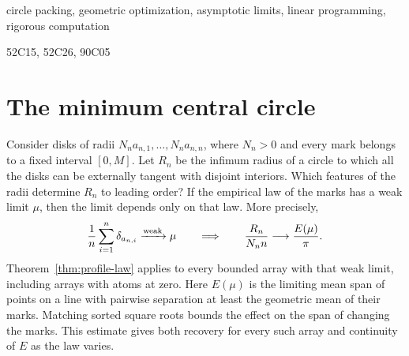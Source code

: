 \documentclass[review,hidelinks,onefignum,onetabnum]{siamart251216}
\begin{document}
\maketitle
\begin{abstract}
Let $R_n$ be the infimum radius of a central circle externally tangent
to $n$ disks with pairwise disjoint interiors. Write the outer radii as
$N_n a_{n,i}$, with positive scales $N_n$ and uniformly bounded
nonnegative marks. If the empirical laws of the marks converge weakly
to $\mu$, then $R_n/(N_n n)\to E(\mu)/\pi$. Here $E(\mu)$ is the limiting
mean span of points on a line whose pairwise separations are at least the
geometric means of their marks. A linear program on $k$ quantile types
and words of length $r$ encloses the limiting ring coefficient within an
interval of width $M(k+r)/(\pi kr)$ before numerical evaluation of the
word costs, where $M$ is the common mark bound.
For consecutive integer radii the minimum grows quadratically, with leading
coefficient $0.1405694688<C_\ast<0.140958576058$. Coupled terminal subsets give
the lower bound and a rational line placement gives the upper bound. The
profile theorem also applies to every fixed positive power of the labels.
For square radii the growth is cubic, with leading coefficient
$(434+4\sqrt2)/(1587\pi)\le C_2<0.088581212993$.
\end{abstract}
\begin{keywords}
circle packing, geometric optimization, asymptotic limits, linear programming,
rigorous computation
\end{keywords}
\begin{MSCcodes}
52C15, 52C26, 90C05
\end{MSCcodes}

\section{The minimum central circle}

Consider disks of radii $N_n a_{n,1},\ldots,N_n a_{n,n}$, where $N_n>0$
and every mark belongs to a fixed interval $[0,M]$. Let $R_n$ be the
infimum radius of a circle to which all the disks can be externally
tangent with disjoint interiors. Which features of the radii determine
$R_n$ to leading order? If the empirical law of the marks has a weak
limit $\mu$, then the limit depends only on that law. More precisely,
\[
  \frac1n\sum_{i=1}^n\delta_{a_{n,i}}\xrightarrow{\rm weak}\mu
  \qquad\Longrightarrow\qquad
  \frac{R_n}{N_n n}\longrightarrow\frac{E(\mu)}{\pi}.
\]
Theorem~\ref{thm:profile-law} applies to every bounded array with that
weak limit, including arrays with atoms at zero. Here $E(\mu)$ is the
limiting mean span of points on a line with pairwise separation at least
the geometric mean of their marks. Matching sorted square roots bounds
the effect on the span of changing the marks. This estimate gives both
recovery for every such array and continuity of $E$ as the law varies.
\end{document}
